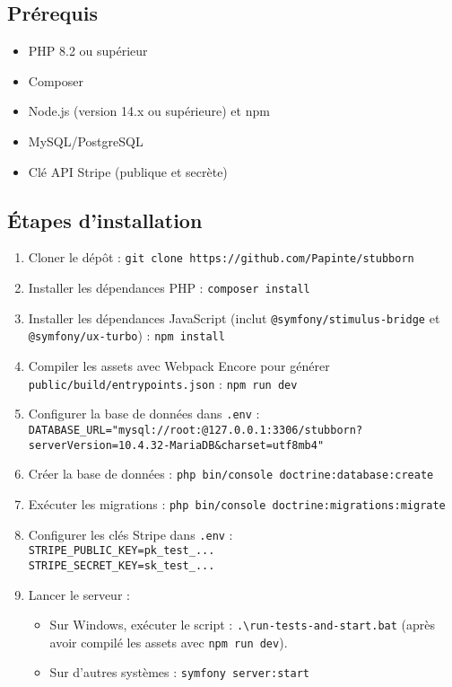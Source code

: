 \documentclass[a4paper,11pt]{article}
\begin{document}
\subsection{Prérequis}
\begin{itemize}
    \item PHP 8.2 ou supérieur
    \item Composer
    \item Node.js (version 14.x ou supérieure) et npm
    \item MySQL/PostgreSQL
    \item Clé API Stripe (publique et secrète)
\end{itemize}

\subsection{Étapes d'installation}
\begin{enumerate}
    \item Cloner le dépôt : \texttt{git clone https://github.com/Papinte/stubborn}
    \item Installer les dépendances PHP : \texttt{composer install}
    \item Installer les dépendances JavaScript (inclut \texttt{@symfony/stimulus-bridge} et \texttt{@symfony/ux-turbo}) : \texttt{npm install}
    \item Compiler les assets avec Webpack Encore pour générer \texttt{public/build/entrypoints.json} : \texttt{npm run dev}
    \item Configurer la base de données dans \texttt{.env} : \\
          \texttt{DATABASE\_URL="mysql://root:@127.0.0.1:3306/stubborn?serverVersion=10.4.32-MariaDB&charset=utf8mb4"}
    \item Créer la base de données : \texttt{php bin/console doctrine:database:create}
    \item Exécuter les migrations : \texttt{php bin/console doctrine:migrations:migrate}
    \item Configurer les clés Stripe dans \texttt{.env} : \\
          \texttt{STRIPE\_PUBLIC\_KEY=pk\_test\_...} \\
          \texttt{STRIPE\_SECRET\_KEY=sk\_test\_...}
    \item Lancer le serveur :
    \begin{itemize}
        \item Sur Windows, exécuter le script : \texttt{.\textbackslash run-tests-and-start.bat} (après avoir compilé les assets avec \texttt{npm run dev}).
        \item Sur d’autres systèmes : \texttt{symfony server:start}
    \end{itemize}
\end{enumerate}
\end{document}
